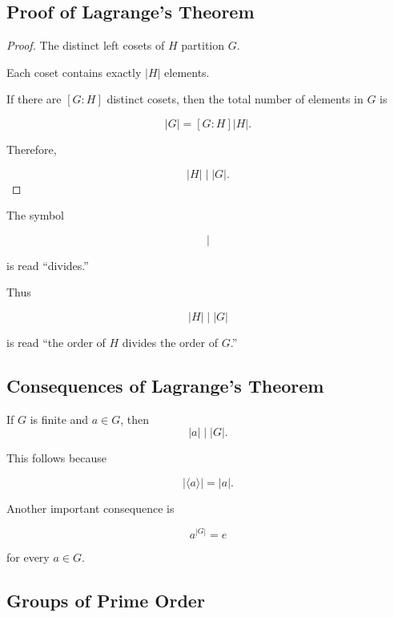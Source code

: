 \subsection{Proof of Lagrange's Theorem}
\label{subsec:proof-lagrange}

\begin{proof}
The distinct left cosets of \(H\) partition \(G\).

Each coset contains exactly \(|H|\) elements.

If there are \([G:H]\) distinct cosets, then the total number of elements in
\(G\) is

\[ |G|=[G:H]|H|. \]

Therefore,

\[ |H|\mid|G|. \]
\end{proof}

The symbol

\[ \mid \]

is read ``divides.''

Thus

\[ |H|\mid|G| \]

is read ``the order of \(H\) divides the order of \(G\).''

\subsection{Consequences of Lagrange's Theorem}
\label{subsec:lagrange-consequences}

\begin{corollary}
If \(G\) is finite and \(a\in G\), then
\[ |a|\mid|G|. \]
\end{corollary}

This follows because

\[ |\langle a\rangle|=|a|. \]

Another important consequence is

\[ a^{|G|}=e \]

for every \(a\in G\).

\subsection{Groups of Prime Order}
\label{subsec:groups-prime-order}


